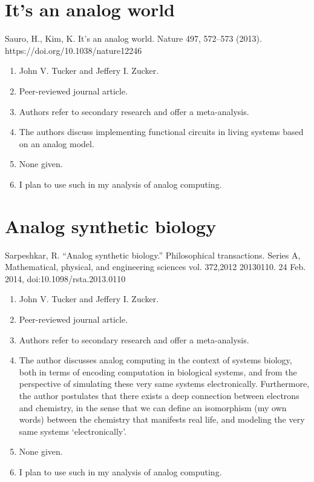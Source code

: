 \section*{It’s an analog world}
Sauro, H., Kim, K. It's an analog world. Nature 497, 572–573 (2013). https://doi.org/10.1038/nature12246
\begin{enumerate}
    \item John V. Tucker and Jeffery I. Zucker.
    \item Peer-reviewed journal article.
    \item Authors refer to secondary research and offer a meta-analysis.
    \item The authors discuss implementing functional circuits in living systems based on an analog model.
    \item None given. 
    \item I plan to use such in my analysis of analog computing. 
\end{enumerate}


\section*{Analog synthetic biology}
Sarpeshkar, R. “Analog synthetic biology.” Philosophical transactions. Series A, Mathematical, physical, and engineering sciences vol. 372,2012 20130110. 24 Feb. 2014, doi:10.1098/rsta.2013.0110
\begin{enumerate}
    \item John V. Tucker and Jeffery I. Zucker.
    \item Peer-reviewed journal article.
    \item Authors refer to secondary research and offer a meta-analysis.
    \item The author discusses analog computing in the context of systems biology, both in terms of encoding computation in biological systems, and from the perspective of simulating these very same systems electronically. Furthermore, the author postulates that there exists a deep connection between electrons and chemistry, in the sense that we can define an isomorphism (my own words) between the chemistry that manifests real life, and modeling the very same systems `electronically'.  
    \item None given. 
    \item I plan to use such in my analysis of analog computing. 
\end{enumerate}

